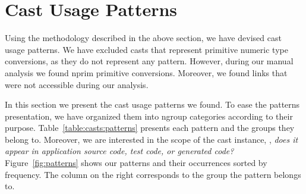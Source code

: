 


\newcommand{\castpatternsection}[1]{\noindent\textbf{#1.}}
\newcommand{\pname}[1]{\textsc{#1}}
\newcommand{\group}[1]{

\

\

{\noindent\Large Patterns for \textsc{#1}}

\


}


\newenvironment{pattern}[1]{
\newcommand{\nocc}{\csname n#1Pattern\endcsname{}}
\newcommand{\noccsrc}{\csname n#1PatternSrc\endcsname{}}
\newcommand{\noccgen}{\csname n#1PatternGen\endcsname{}}
\newcommand{\nocctest}{\csname n#1PatternTest\endcsname{}}
\newcommand{\pocc}{\csname p#1Pattern\endcsname{}}

\newcommand{\desc}{\castpatternsection{Description}}
\newcommand{\instances}{\castpatternsection{Instances: \nocc{} (\pocc\%)}
We found \noccsrc{} in application code, \nocctest{} in test code, and \noccgen{} in generated code.}
\newcommand{\discussion}{\castpatternsection{Discussion}}
\newcommand{\thisp}{\textsc{#1}}
\subsection{\pname{#1}}
\label{pat:#1}
\desc
}{}


\section{Cast Usage Patterns}
\label{sec:casts:patterns}

%
Using the methodology described in the above section,
we have devised \nPattern{} cast usage patterns.
We have excluded casts that represent primitive numeric type conversions,
as they do not represent any pattern.
However, during our manual analysis we found nprim{} primitive conversions.
Moreover, we found \nBrokenLink{} links that were not accessible during our analysis.

In this section we present the cast usage patterns we found.
To ease the patterns presentation,
%
%
we have organized them into ngroup{} categories according to their purpose.
Table~\ref{table:casts:patterns} presents each pattern and the groups they belong to.
Moreover, we are interested in the scope of the cast instance,
\ie, \emph{does it appear in application source code, test code, or generated code?}
%
%
Figure~\ref{fig:patterns} shows our patterns and their occurrences sorted by frequency.
The column on the right corresponds to the group the pattern belongs to.

